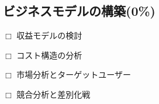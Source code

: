   \subsection{ビジネスモデルの構築(0\%)}
    \label{sec:ビジネスモデルの構築}
      \par $\Box$ 収益モデルの検討
      \par $\Box$ コスト構造の分析
      \par $\Box$ 市場分析とターゲットユーザー
      \par $\Box$ 競合分析と差別化戦
